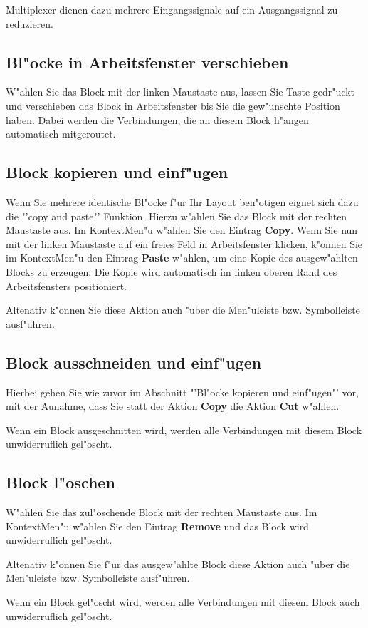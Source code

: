 \documentclass[a4paper,titlepage,12pt,ngerman]{scrbook}
\begin{document}
Multiplexer dienen dazu mehrere Eingangssignale auf ein Ausgangssignal zu reduzieren.

\subsection{Bl"ocke in Arbeitsfenster verschieben}
W"ahlen Sie das Block mit der linken Maustaste aus, lassen Sie Taste gedr"uckt und verschieben das Block in Arbeitsfenster bis Sie die gew"unschte Position haben. Dabei werden die Verbindungen, die an diesem Block h"angen automatisch mitgeroutet.


\subsection{Block kopieren und einf"ugen}
Wenn Sie mehrere identische Bl"ocke f"ur Ihr Layout ben"otigen eignet sich dazu die "'copy and paste"' Funktion. Hierzu w"ahlen Sie das Block mit der rechten Maustaste aus. Im KontextMen"u w"ahlen Sie den Eintrag {\bf Copy}. Wenn Sie nun mit der linken Maustaste auf ein freies Feld in Arbeitsfenster
klicken, k"onnen Sie im KontextMen"u den Eintrag {\bf Paste} w"ahlen, um eine Kopie des ausgew"ahlten Blocks zu erzeugen.
Die Kopie wird automatisch im linken oberen Rand des Arbeitsfensters positioniert.\par
Altenativ k"onnen Sie diese Aktion auch "uber die Men"uleiste bzw. Symbolleiste ausf"uhren.


\subsection{Block ausschneiden und einf"ugen}
Hierbei gehen Sie wie zuvor im Abschnitt "'Bl"ocke kopieren und einf"ugen"' vor, mit der Aunahme, dass Sie statt der Aktion {\bf Copy} die Aktion {\bf Cut} w"ahlen. \par
Wenn ein Block ausgeschnitten wird, werden alle Verbindungen mit diesem Block unwiderruflich gel"oscht.


\subsection{Block l"oschen}
W"ahlen Sie das zul"oschende Block mit der rechten Maustaste aus. Im KontextMen"u w"ahlen Sie den Eintrag {\bf Remove} und das Block wird unwiderruflich gel"oscht.\par
Altenativ k"onnen Sie f"ur das ausgew"ahlte Block diese Aktion auch "uber die Men"uleiste bzw. Symbolleiste ausf"uhren.\par
Wenn ein Block gel"oscht wird, werden alle Verbindungen mit diesem Block auch unwiderruflich gel"oscht.
\end{document}
